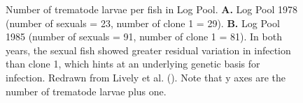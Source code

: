 \documentclass[
  letterpaper,
]{book}
\begin{document}
\begin{figure}


\caption[Number of trematode larvae per fish in Log
Pool]{\label{fig-5-1}Number of trematode larvae per fish in Log Pool.
\textbf{A.} Log Pool 1978 (number of sexuals = 23, number of clone 1 =
29). \textbf{B.} Log Pool 1985 (number of sexuals = 91, number of clone
1 = 81). In both years, the sexual fish showed greater residual
variation in infection than clone 1, which hints at an underlying
genetic basis for infection. Redrawn from Lively et al.
(). Note that y axes are the number of
trematode larvae plus one.}

\end{figure}%
\end{document}

